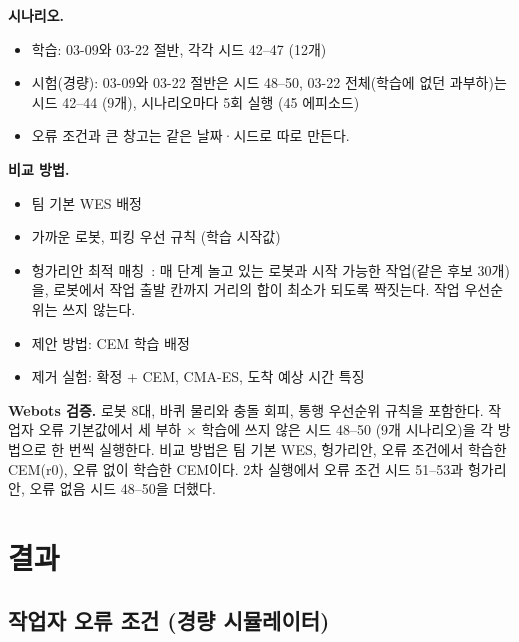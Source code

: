 \documentclass[10pt,twocolumn]{article}
\begin{document}
\textbf{시나리오.}
\begin{itemize}
  \item 학습: 03-09와 03-22 절반, 각각 시드 42--47 (12개)
  \item 시험(경량): 03-09와 03-22 절반은 시드 48--50, 03-22 전체(학습에 없던 과부하)는 시드 42--44 (9개), 시나리오마다 5회 실행 (45 에피소드)
  \item 오류 조건과 큰 창고는 같은 날짜·시드로 따로 만든다.
\end{itemize}

\textbf{비교 방법.}
\begin{itemize}
  \item 팀 기본 WES 배정
  \item 가까운 로봇, 피킹 우선 규칙 (학습 시작값)
  \item 헝가리안 최적 매칭~\cite{kuhn1955}: 매 단계 놀고 있는 로봇과 시작 가능한 작업(같은 후보 30개)을, 로봇에서 작업 출발 칸까지 거리의 합이 최소가 되도록 짝짓는다. 작업 우선순위는 쓰지 않는다. %
  \item 제안 방법: CEM 학습 배정
  \item 제거 실험: 확정 + CEM, CMA-ES, 도착 예상 시간 특징
\end{itemize}

\textbf{Webots 검증.}
로봇 8대, 바퀴 물리와 충돌 회피, 통행 우선순위 규칙을 포함한다.
작업자 오류 기본값에서 세 부하 $\times$ 학습에 쓰지 않은 시드 48--50 (9개 시나리오)을 각 방법으로 한 번씩 실행한다. %
비교 방법은 팀 기본 WES, 헝가리안, 오류 조건에서 학습한 CEM(r0), 오류 없이 학습한 CEM이다.
2차 실행에서 오류 조건 시드 51--53과 헝가리안, 오류 없음 시드 48--50을 더했다. %

\section{결과}

\subsection{작업자 오류 조건 (경량 시뮬레이터)}
\end{document}
